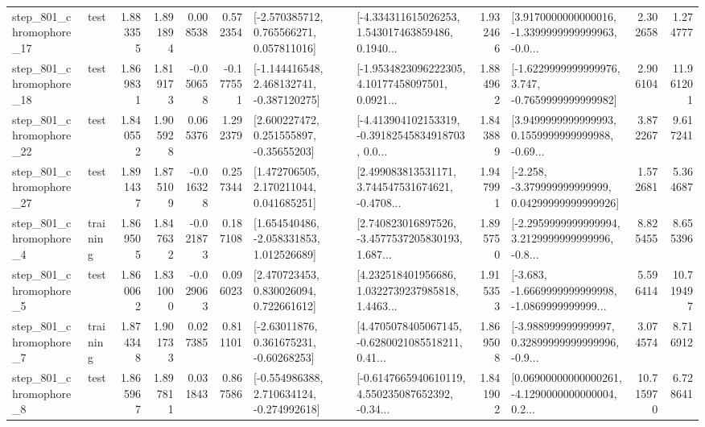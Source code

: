 \begin{tabular}{llrrrrllrlrr}
  step\_801\_chromophore\_17 &      test &      1.883355 &    1.891894 &      0.008538 &  0.572354 &    [-2.570385712, 0.765566271, 0.057811016] &  [-4.334311615026253, 1.543017463859486, 0.1940... &       1.932466 &  [3.9170000000000016, -1.3399999999999963, -0.0... &            2.302658 &          1.274777 \\
  step\_801\_chromophore\_18 &      test &      1.869831 &    1.819173 &     -0.050658 & -0.177551 &   [-1.144416548, 2.468132741, -0.387120275] &  [-1.9534823096222305, 4.10177458097501, 0.0921... &       1.884962 &  [-1.6229999999999976, 3.747, -0.7659999999999982] &            2.906104 &         11.961201 \\
  step\_801\_chromophore\_22 &      test &      1.840552 &    1.905928 &      0.065376 &  1.292379 &     [2.600227472, 0.251555897, -0.35655203] &  [-4.413904102153319, -0.39182545834918703, 0.0... &       1.843889 &  [3.9499999999999993, 0.1559999999999988, -0.69... &            3.872267 &          9.617241 \\
  step\_801\_chromophore\_27 &      test &      1.891437 &    1.875109 &     -0.016328 &  0.257344 &     [1.472706505, 2.170211044, 0.041685251] &  [2.499083813531171, 3.744547531674621, -0.4708... &       1.947991 &  [-2.258, -3.379999999999999, 0.04299999999999926] &            1.572681 &          5.364687 \\
   step\_801\_chromophore\_4 &  training &      1.869505 &    1.847632 &     -0.021873 &  0.187108 &    [1.654540486, -2.058331853, 1.012526689] &  [2.740823016897526, -3.4577537205830193, 1.687... &       1.895750 &  [-2.2959999999999994, 3.2129999999999996, -0.8... &            8.825455 &          8.655396 \\
   step\_801\_chromophore\_5 &      test &      1.860062 &    1.831000 &     -0.029063 &  0.096023 &     [2.470723453, 0.830026094, 0.722661612] &  [4.232518401956686, 1.0322739237985818, 1.4463... &       1.915353 &  [-3.683, -1.6669999999999998, -1.0869999999999... &            5.596414 &         10.719497 \\
   step\_801\_chromophore\_7 &  training &      1.874348 &    1.901733 &      0.027385 &  0.811101 &     [-2.63011876, 0.361675231, -0.60268253] &  [4.4705078405067145, -0.6280021085518211, 0.41... &       1.869508 &  [-3.988999999999997, 0.32899999999999996, -0.9... &            3.074574 &          8.716912 \\
   step\_801\_chromophore\_8 &      test &      1.865967 &    1.897811 &      0.031843 &  0.867586 &   [-0.554986388, 2.710634124, -0.274992618] &  [-0.6147665940610119, 4.550235087652392, -0.34... &       1.841902 &  [0.06900000000000261, -4.1290000000000004, 0.2... &           10.715970 &          6.728641 \\

\end{tabular}
